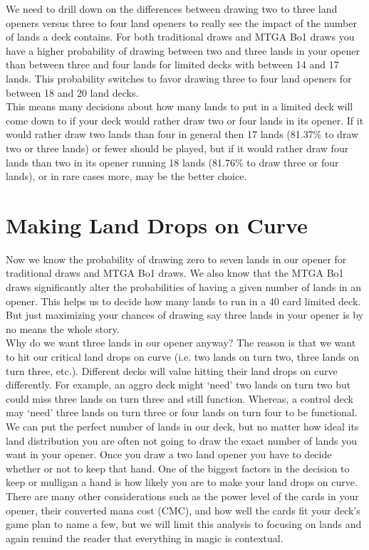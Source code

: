\documentclass[oneside]{book}   %
\begin{document}
We need to drill down on the differences between drawing two to three land openers versus three to four land openers to really see the impact of the number of lands a deck contains. For both traditional draws and MTGA Bo1 draws you have a higher probability of drawing between two and three lands in your opener than between three and four lands for limited decks with between 14 and 17 lands. This probability switches to favor drawing three to four land openers for between 18 and 20 land decks. \\

This means many decisions about how many lands to put in a limited deck will come down to if your deck would rather draw two or four lands in its opener. If it would rather draw two lands than four in general then 17 lands (81.37\% to draw two or three lands) or fewer should be played, but if it would rather draw four lands than two in its opener running 18 lands (81.76\% to draw three or four lands), or in rare cases more, may be the better choice.  

\section{Making Land Drops on Curve}
\label{curve}

Now we know the probability of drawing zero to seven lands in our opener for traditional draws and MTGA Bo1 draws. We also know that the MTGA Bo1 draws significantly alter the probabilities of having a given number of lands in an opener. This helps us to decide how many lands to run in a 40 card limited deck. But just maximizing your chances of drawing say three lands in your opener is by no means the whole story. \\

Why do we want three lands in our opener anyway? The reason is that we want to hit our critical land drops on curve (i.e. two lands on turn two, three lands on turn three, etc.). Different decks will value hitting their land drops on curve differently. For example, an aggro deck might `need' two lands on turn two but could miss three lands on turn three and still function. Whereas, a control deck may `need' three lands on turn three or four lands on turn four to be functional. \\

We can put the perfect number of lands in our deck, but no matter how ideal its land distribution you are often not going to draw the exact number of lands you want in your opener. Once you draw a two land opener you have to decide whether or not to keep that hand. One of the biggest factors in the decision to keep or mulligan a hand is how likely you are to make your land drops on curve. There are many other considerations such as the power level of the cards in your opener, their converted mana cost (CMC), and how well the cards fit your deck's game plan to name a few, but we will limit this analysis to focusing on lands and again remind the reader that everything in magic is contextual.\\
\end{document}
